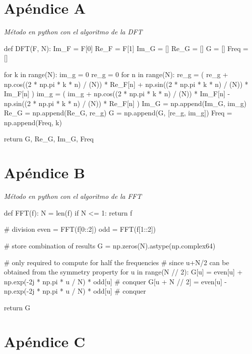 \newpage
\onecolumn

\section*{Apéndice A}
\label{ApendiceA}

\emph{Método en python con el algoritmo de la DFT}

\begin{python}
    def DFT(F, N):
    Im_F = F[0]
    Re_F = F[1]
    Im_G = []
    Re_G = []
    G = []
    Freq = []

    for k in range(N):
    im_g = 0
    re_g = 0
    for n in range(N):
    re_g = (
    re_g
    + np.cos((2 * np.pi * k * n) / (N)) * Re_F[n]
    + np.sin((2 * np.pi * k * n) / (N)) * Im_F[n]
    )
    im_g = (
    im_g
    + np.cos((2 * np.pi * k * n) / (N)) * Im_F[n]
    - np.sin((2 * np.pi * k * n) / (N)) * Re_F[n]
    )
    Im_G = np.append(Im_G, im_g)
    Re_G = np.append(Re_G, re_g)
    G = np.append(G, [re_g, im_g])
    Freq = np.append(Freq, k)

    return G, Re_G, Im_G, Freq
\end{python}



\section*{Apéndice B}
\label{ApendiceB}

\emph{Método en python con el algoritmo de la FFT}

\begin{python}
    def FFT(f):
    N = len(f)
    if N <= 1:
    return f

    # division
    even = FFT(f[0::2])
    odd = FFT(f[1::2])

    # store combination of results
    G = np.zeros(N).astype(np.complex64)

    # only required to compute for half the frequencies
    # since u+N/2 can be obtained from the symmetry property
    for u in range(N // 2):
    G[u] = even[u] + np.exp(-2j * np.pi * u / N) * odd[u]  # conquer
    G[u + N // 2] = even[u] - np.exp(-2j * np.pi * u / N) * odd[u]  # conquer

    return G
\end{python}

\newpage

\section*{Apéndice C}
\label{ApendiceC}

